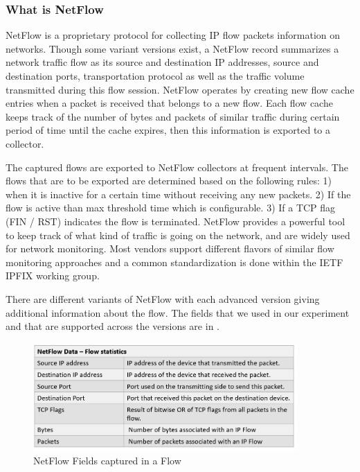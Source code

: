 \subsubsection{What is NetFlow}
NetFlow is a proprietary protocol for collecting IP flow packets information on networks. Though some variant versions exist, a NetFlow record summarizes a network traffic flow as its source and destination IP addresses, source and destination ports, transportation protocol as well as the traffic volume transmitted during this flow session. NetFlow operates by creating new flow cache entries when a packet is received that belongs to a new flow. Each flow cache keeps track of the number of bytes and packets of similar traffic during certain period of time until the cache expires, then this information is exported to a collector. 

The captured flows are exported to NetFlow collectors at frequent intervals. The flows that are to be exported are determined based on the following rules: 1) when it is inactive for a certain time without receiving any new packets. 2) If the flow is active than max threshold time which is configurable. 3) If a TCP flag (FIN / RST) indicates the flow is terminated. NetFlow provides a powerful tool to keep track of what kind of traffic is going on the network, and are widely used for network monitoring. Most vendors support different flavors of similar flow monitoring approaches and a common standardization is done within the IETF IPFIX working group.

There are different variants of NetFlow with each advanced version giving additional information about the flow. The fields that we used in our experiment and that are supported across the versions are in .

\begin{figure}[t]
	\centering
	\includegraphics[width=0.9\textwidth]{netflow.png}
	\caption{NetFlow Fields captured in a Flow }
\end{figure}

